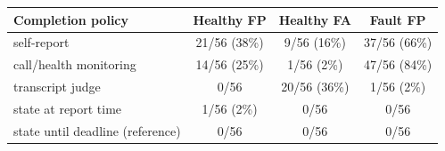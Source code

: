 \begingroup\setlength{\tabcolsep}{5pt}
\begin{tabular}{@{}p{4.4cm}ccc@{}}
\hline
\textbf{Completion policy} & \textbf{Healthy FP} & \textbf{Healthy FA} & \textbf{Fault FP} \\
\hline
self-report & 21/56 (38\%) & 9/56 (16\%) & 37/56 (66\%) \\[1pt]
call/health monitoring & 14/56 (25\%) & 1/56 (2\%) & 47/56 (84\%) \\[1pt]
transcript judge & 0/56 & 20/56 (36\%) & 1/56 (2\%) \\[1pt]
state at report time & 1/56 (2\%) & 0/56 & 0/56 \\[1pt]
state until deadline (reference) & 0/56 & 0/56 & 0/56 \\
\hline
\end{tabular}
\endgroup
